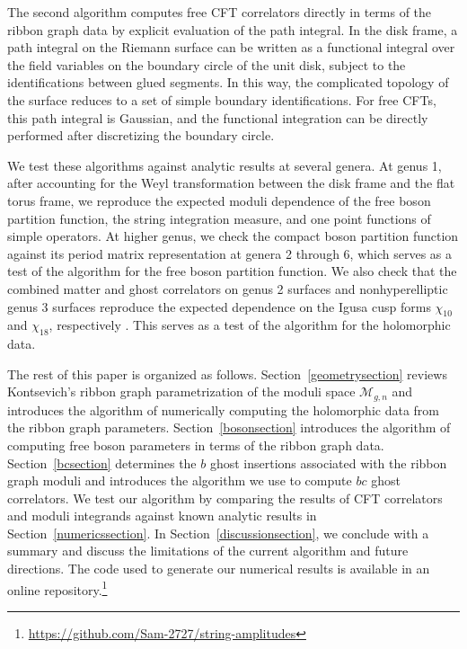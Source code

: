 \documentclass[12pt]{article}
\numberwithin{equation}{section}
\begin{document}
The second algorithm computes free CFT correlators directly in terms of the ribbon graph data by explicit evaluation of the path integral. In the disk frame, a path integral on the Riemann surface can be written as a functional integral over the field variables on the boundary circle of the unit disk, subject to the identifications between glued segments. In this way, the complicated topology of the surface reduces to a set of simple boundary identifications. For free CFTs, this path integral is Gaussian, and the functional integration can be directly performed after discretizing the boundary circle.

We test these algorithms against analytic results at several genera. At genus 1, after accounting for the Weyl transformation between the disk frame and the flat torus frame, we reproduce the expected moduli dependence of the free boson partition function, the string integration measure, and one point functions of simple operators. At higher genus, we check the compact boson partition function against its period matrix representation at genera 2 through 6, which serves as a test of the algorithm for the free boson partition function. We also check that the combined matter and ghost correlators on genus 2 surfaces and nonhyperelliptic genus 3 surfaces reproduce the expected dependence on the Igusa cusp forms $\chi_{10}$ and $\chi_{18}$, respectively \cite{DHokerPhong:1988,Igusa:1962,Igusa:1967}. This serves as a test of the algorithm for the holomorphic data.

The rest of this paper is organized as follows. Section~\ref{geometrysection} reviews Kontsevich's ribbon graph parametrization of the moduli space $\mathcal{M}_{g,n}$ and introduces the algorithm of numerically computing the holomorphic data from the ribbon graph parameters. Section~\ref{bosonsection} introduces the algorithm of computing free boson parameters in terms of the ribbon graph data. Section~\ref{bcsection} determines the $b$ ghost insertions associated with the ribbon graph moduli and introduces the algorithm we use to compute $bc$ ghost correlators. We test our algorithm by comparing the results of CFT correlators and moduli integrands against known analytic results in Section~\ref{numericssection}. In Section~\ref{discussionsection}, we conclude with a summary and discuss the limitations of the current algorithm and future directions. The code used to generate our numerical results is available in an online repository.\footnote{\url{https://github.com/Sam-2727/string-amplitudes}}
\end{document}

